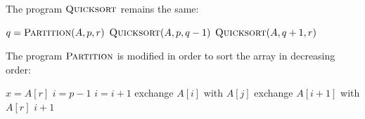 \documentclass[12pt,reqno]{amsart}
\newif\ifanswer
\begin{document}
\begin{enumerate}[1.]
\ifanswer
{}
The program $\textsc{Quicksort}$ remains the same:
\begin{algorithm}
    \caption{$\textsc{Quicksort}(A, p, r)$}
    \begin{algorithmic}[1]
            \STATE $q = \textsc{Partition}(A, p, r)$
            \STATE $\textsc{Quicksort}(A, p, q - 1)$
            \STATE $\textsc{Quicksort}(A, q + 1, r)$
        \ENDIF
    \end{algorithmic}
\end{algorithm}
\newpage
The program $\textsc{Partition}$ is modified in order to sort the array in decreasing order:
\begin{algorithm}
    \caption{$\textsc{Partition'}(A, p, r)$}
    \begin{algorithmic}[1]
        \STATE $x = A[r]$
        \STATE $i = p - 1$
                \STATE $i = i + 1$
                \STATE exchange $A[i]$ with $A[j]$
            \ENDIF
        \ENDFOR
        \STATE exchange $A[i + 1]$ with $A[r]$
        \RETURN $i + 1$
    \end{algorithmic}
\end{algorithm}
\vspace{1cm}



\end{enumerate}
\end{document}
